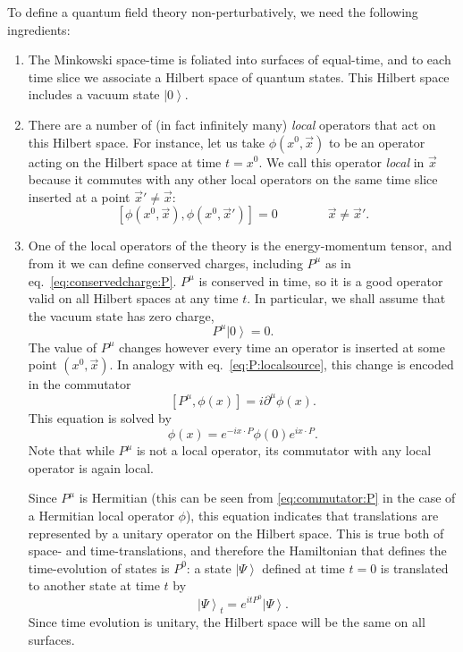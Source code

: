 \documentclass[a4paper,12pt]{article}
\newcommand{\ket}[1]{\left| #1 \right\rangle}
\numberwithin{equation}{section}
\begin{document}
To define a quantum field theory non-perturbatively, we need the following ingredients:
\begin{enumerate}

\item
The Minkowski space-time is foliated into surfaces of equal-time,
and to each time slice we associate a Hilbert space of quantum states.
This Hilbert space includes a vacuum state $\ket{0}$.

\item
There are a number of (in fact infinitely many) \emph{local} operators that act on this Hilbert space. For instance, let us take $\phi(x^0, \vec{x})$ to be an operator acting on the Hilbert space at time $t = x^0$.
We call this operator \emph{local} in $\vec{x}$ because it commutes with any other local operators on the same time slice inserted at a point $\vec{x}' \neq \vec{x}$:
\begin{equation}
	\left[ \phi(x^0, \vec{x}), \phi(x^0, \vec{x}') \right]
	= 0 
	\qquad\qquad
	\vec{x} \neq \vec{x}'.
	\label{eq:locality:equaltime}
\end{equation}

\item
One of the local operators of the theory is the energy-momentum tensor, and from it we can define conserved charges, including $P^\mu$ as in eq.~\eqref{eq:conservedcharge:P}. $P^\mu$ is conserved in time, so it is a good operator valid on all Hilbert spaces at any time $t$. 
In particular, we shall assume that the vacuum state has zero charge,
\begin{equation}
	P^\mu \ket{0} = 0.
	\label{eq:vacuuminvariance:P}
\end{equation}
The value of $P^\mu$ changes however every time an operator is inserted at some point $(x^0, \vec{x})$. In analogy with eq.~\eqref{eq:P:localsource}, this change is encoded in the commutator
\begin{equation}
	\left[ P^\mu, \phi(x) \right] = i \partial^\mu \phi(x).
	\label{eq:commutator:P}
\end{equation}
This equation is solved by 
\begin{equation}
	\phi(x) = e^{-i x \cdot P} \phi(0) e^{i x \cdot P}.
	\label{eq:P:exponentiated}
\end{equation}
Note that while $P^\mu$ is not a local operator, its commutator with any local operator is again local.

Since $P^\mu$ is Hermitian (this can be seen from \eqref{eq:commutator:P} in the case of a Hermitian local operator $\phi$), this equation indicates that translations are represented by a unitary operator on the Hilbert space.
This is true both of space- and time-translations, and therefore the Hamiltonian that defines the time-evolution of states is $P^0$: a state $\ket{\Psi}$ defined at time $t = 0$ is translated to another state at time $t$ by 
\begin{equation}
	\ket{ \Psi}_t = e^{i t P^0} \ket{ \Psi}.
\end{equation}
Since time evolution is unitary, the Hilbert space will be the same on all surfaces.


\end{enumerate}
\end{document}
